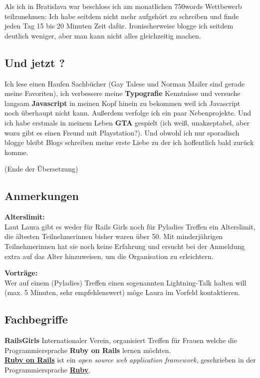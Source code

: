 \documentclass[10pt,a4paper,ngerman,twoside]{article} %
\begin{document}
\begin{multicols}{3}
Als ich in Bratislava war beschloss ich am monatlichen 750words Wettbewerb teilzunehmen: Ich habe seitdem nicht mehr aufgehört zu schreiben und finde jeden Tag 15 bis 20 Minuten Zeit dafür. Ironischerweise blogge ich seitdem deutlich weniger, aber man kann nicht alles gleichzeitig machen. 

\subsection*{Und jetzt ?}

Ich lese einen Haufen Sachbücher (Gay Talese und Norman Mailer sind gerade meine Favoriten), ich verbessere meine \textbf{Typografie} Kenntnisse und versuche langsam \textbf{Javascript} in meinen Kopf hinein zu bekommen weil ich Javascript noch überhaupt nicht kann. Außerdem verfolge ich ein paar Nebenprojekte. Und ich habe erstmals in meinem Leben \textbf{GTA} gespielt (ich weiß, unakzeptabel, aber wozu gibt es einen Freund mit Playstation?). Und obwohl ich nur sporadisch blogge bleibt Blogs schreiben meine erste Liebe zu der ich hoffentlich bald zurück komme. 

(Ende der Übersetzung)

\subsection*{Anmerkungen}
\textbf{Alterslimit:} \\
Laut Laura gibt es weder für Rails Girls noch für Pyladies Treffen ein Alterslimit, die ältesten Teilnehmerinnen bisher waren über 50. Mit minderjährigen  Teilnehmerinnen hat sie noch keine Erfahrung und ersucht bei der Anmeldung extra auf das Alter hinzuweisen, um die Organisation zu erleichtern.

\textbf{Vorträge:} \\
Wer auf einem (Pyladies) Treffen einen sogenannten Lightning-Talk halten will (max. 5 Minuten, sehr empfehlenswert) möge Laura im Vorfeld kontaktieren. 


\subsection*{Fachbegriffe}

\textbf{RailsGirls} Internationaler Verein, organisiert Treffen für Frauen welche die Programmiersprache \textbf{Ruby on Rails} lernen möchten. \\

\href{https://en.wikipedia.org/wiki/Ruby_on_rails}{\textbf{Ruby on Rails}} ist ein \textit{open source web application framework}, geschrieben in der Programmiersprache \href{ruby}{\textbf{Ruby}}. 


\end{multicols}
\end{document}
